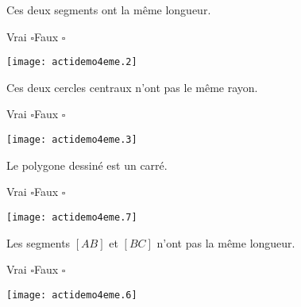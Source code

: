 {
\begin{multicols}{2}
\begin{center}
Ces deux segments ont la même longueur.
\par
{\sc Vrai} $\square$\hfill{\sc Faux} $\square$
\par\texttt{[image: actidemo4eme.2]}
\end{center}
\begin{center}
Ces deux cercles centraux n'ont pas le même rayon.
\par
{\sc Vrai} $\square$\hfill{\sc Faux} $\square$
\par\texttt{[image: actidemo4eme.3]}
\end{center}
\vskip10cm
\begin{center}
Le polygone dessiné est un carré.
\par
{\sc Vrai} $\square$\hfill{\sc Faux} $\square$
\par\texttt{[image: actidemo4eme.7]}
\end{center}
\par
\begin{center}
Les segments $[AB]$ et $[BC]$ n'ont pas la même longueur.
\par
{\sc Vrai} $\square$\hfill{\sc Faux} $\square$
\par\texttt{[image: actidemo4eme.6]}
\end{center}
\end{multicols}
}
